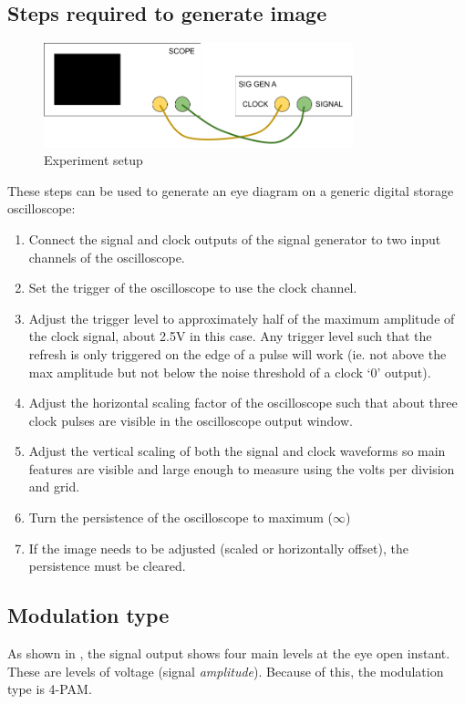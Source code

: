 \documentclass[11pt]{article}
\begin{document}
\subsection{Steps required to generate image}
\begin{figure}[H]
    \centering
    \includegraphics[width=0.8\textwidth]{scope_setup.png}
    \caption{Experiment setup}
\end{figure}
These steps can be used to generate an eye diagram on a generic digital storage
oscilloscope:
\begin{enumerate}
    \item Connect the signal and clock outputs of the signal generator to two
          input channels of the oscilloscope.
    \item Set the trigger of the oscilloscope to use the clock channel.
    \item Adjust the trigger level to approximately half of the maximum
          amplitude of the clock signal, about 2.5V in this case. Any trigger
          level such that the refresh is only triggered on the edge of a pulse
          will work (ie. not above the max amplitude but not below the noise
          threshold of a clock `0' output).
    \item Adjust the horizontal scaling factor of the oscilloscope such that
          about three clock pulses are visible in the oscilloscope output
          window.
    \item Adjust the vertical scaling of both the signal and clock waveforms so
          main features are visible and large enough to measure using the volts
          per division and grid.
    \item Turn the persistence of the oscilloscope to maximum ($\infty$)
    \item If the image needs to be adjusted (scaled or horizontally offset), the
          persistence must be cleared.
\end{enumerate}

\subsection{Modulation type}
As shown in , the signal output shows four main levels at the eye
open instant. These are levels of voltage (signal \textit{amplitude}). Because
of this, the modulation type is 4-PAM.
\end{document}

